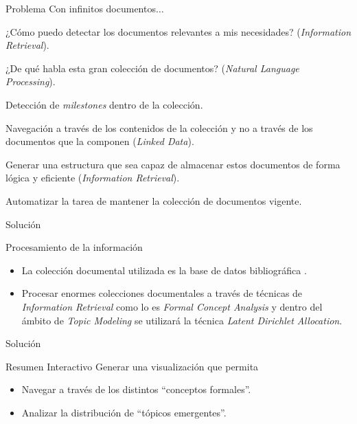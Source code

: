 \begin{tframe}{Problema}
	Con infinitos documentos$\ldots$
	\begin{disadv}
		\item ¿Cómo puedo detectar los documentos relevantes a mis necesidades? (\emph{Information Retrieval}).
		\item ¿De qué habla esta gran colección de documentos? (\emph{Natural Language Processing}).
		\item Detección de \emph{milestones} dentro de la colección.
		\item Navegación a través de los contenidos de la colección y no a través de los documentos que la componen (\emph{Linked Data}).
		\item Generar una estructura que sea capaz de almacenar estos documentos de forma lógica y eficiente (\emph{Information Retrieval}).
		\item Automatizar la tarea de mantener la colección de documentos vigente.
	\end{disadv}
\end{tframe}

\begin{frame}[c]{Solución}
	\begin{block}{Procesamiento de la información}
		\begin{itemize}
			\item La colección documental utilizada es la base de datos bibliográfica .
			\item Procesar enormes colecciones documentales a través de técnicas de \emph{Information Retrieval} como lo es \emph{Formal Concept Analysis} y dentro del ámbito de \emph{Topic Modeling} se utilizará la técnica \emph{Latent Dirichlet Allocation}.
		\end{itemize}
	\end{block}
\end{frame}

\begin{frame}[c]{Solución}
	\begin{block}{Resumen Interactivo}
		Generar una visualización que permita
		\begin{itemize}
			\item Navegar a través de los distintos ``conceptos formales''.
			\item Analizar la distribución de ``tópicos emergentes''.		\end{itemize}
	\end{block}
\end{frame}


